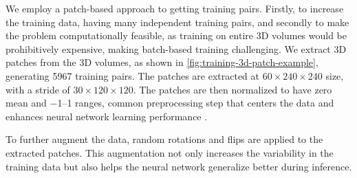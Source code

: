 We employ a patch-based approach to getting training pairs. Firstly, to increase the training data, having many independent training pairs, and secondly to make the problem computationally feasible, as training on entire 3D volumes would be prohibitively expensive, making batch-based training challenging. We extract 3D patches from the 3D volumes, as shown in \cref{fig:training-3d-patch-example}, generating \num{5967} training pairs. The patches are extracted at $60 \times 240 \times 240$ size, with a stride of $30 \times 120 \times 120$. The patches are then normalized to have zero mean and \numrange{-1}{1} ranges, common preprocessing step that centers the data and enhances neural network learning performance \cite{bishopDeepLearningFoundations2024}. 

To further augment the data, random rotations and flips are applied to the extracted patches. This augmentation not only increases the variability in the training data but also helps the neural network generalize better during inference.

